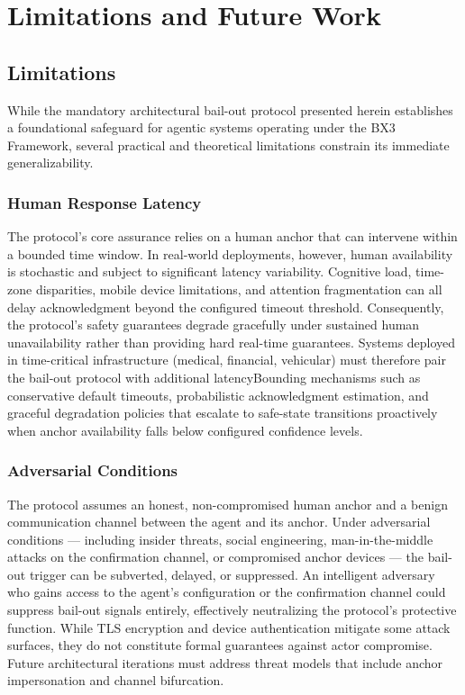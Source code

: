 
\section{Limitations and Future Work}

\subsection{Limitations}
\label{sec:limitations}

While the mandatory architectural bail-out protocol presented herein establishes a
foundational safeguard for agentic systems operating under the BX3 Framework, several
practical and theoretical limitations constrain its immediate generalizability.

\subsubsection{Human Response Latency}
\label{sec:limitations:latency}
The protocol's core assurance relies on a human anchor that can intervene within a
bounded time window. In real-world deployments, however, human availability is
stochastic and subject to significant latency variability. Cognitive load, time-zone
disparities, mobile device limitations, and attention fragmentation can all delay
acknowledgment beyond the configured timeout threshold. Consequently, the protocol's
safety guarantees degrade gracefully under sustained human unavailability rather
than providing hard real-time guarantees. Systems deployed in time-critical
infrastructure (medical, financial, vehicular) must therefore pair the bail-out
protocol with additional latencyBounding mechanisms such as conservative default
timeouts, probabilistic acknowledgment estimation, and graceful degradation
policies that escalate to safe-state transitions proactively when anchor
availability falls below configured confidence levels.

\subsubsection{Adversarial Conditions}
\label{sec:limitations:adversarial}
The protocol assumes an honest, non-compromised human anchor and a benign
communication channel between the agent and its anchor. Under adversarial
conditions — including insider threats, social engineering, man-in-the-middle
attacks on the confirmation channel, or compromised anchor devices — the
bail-out trigger can be subverted, delayed, or suppressed. An intelligent
adversary who gains access to the agent's configuration or the confirmation
channel could suppress bail-out signals entirely, effectively neutralizing the
protocol's protective function. While TLS encryption and device authentication
mitigate some attack surfaces, they do not constitute formal guarantees against
actor compromise. Future architectural iterations must address threat models
that include anchor impersonation and channel bifurcation.

